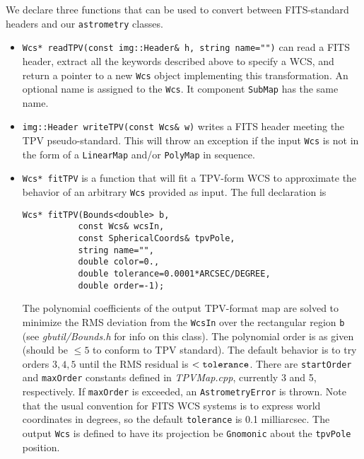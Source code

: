 \documentclass[11pt,preprint,flushrt]{aastex}
\begin{document}
We declare three functions that can be used to convert between FITS-standard headers and our {\tt astrometry} classes.
\begin{itemize}
\item {\tt Wcs* readTPV(const img::Header\& h, string name="")} can read a FITS header, extract all the keywords described above to specify a WCS, and return a pointer to a new {\tt Wcs} object implementing this transformation.  An optional name is assigned to the {\tt Wcs}.  It component {\tt SubMap} has the same name.
\item {\tt img::Header writeTPV(const Wcs\& w)} writes a FITS header meeting the TPV pseudo-standard.  This will throw an exception if the input {\tt Wcs} is not in the form of a {\tt LinearMap} and/or {\tt PolyMap} in sequence.
\item {\tt Wcs* fitTPV} is a function that will fit a TPV-form WCS to approximate the behavior of an arbitrary {\tt Wcs} provided as  input.  The full declaration is
\begin{verbatim}
Wcs* fitTPV(Bounds<double> b,
           const Wcs& wcsIn,
           const SphericalCoords& tpvPole,
           string name="",
           double color=0.,
           double tolerance=0.0001*ARCSEC/DEGREE,
           double order=-1);
\end{verbatim}
The polynomial coefficients of the output TPV-format map are solved to minimize the RMS deviation from the {\tt WcsIn} over the rectangular region {\tt b} (see {\it gbutil/Bounds.h} for info on this class).   The polynomial order is as given (should be $\le5$ to conform to TPV standard).  The default behavior is to try orders $3,4,5$ until the RMS residual is $<{\tt tolerance}$.  There are {\tt startOrder} and {\tt maxOrder} constants defined in {\it TPVMap.cpp}, currently 3 and 5, respectively.  If {\tt maxOrder} is exceeded, an {\tt AstrometryError} is thrown.  Note that the usual convention for FITS WCS systems is to express world coordinates in degrees, so the default {\tt tolerance} is 0.1 milliarcsec.  The output {\tt Wcs} is defined to have its projection be {\tt Gnomonic} about the {\tt tpvPole} position.
\end{itemize}
\end{document}
